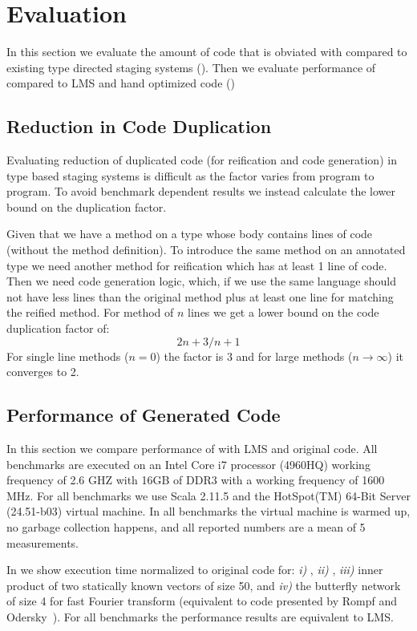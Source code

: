 \section{Evaluation}
\label{sct:evaluation}

In this section we evaluate the amount of code that is obviated with \tool compared to existing
type directed staging systems (). Then we evaluate performance of
\tool compared to LMS and hand optimized code ()

\subsection{Reduction in Code Duplication}
\label{sct:duplication}

Evaluating reduction of duplicated code (for reification and code generation) in type based
staging systems is difficult as the factor varies from program to program. To avoid benchmark dependent
results we instead calculate the lower bound on the duplication factor.

Given that we have a method on a type  whose body contains  lines of code (without
the method definition). To introduce the same method on an annotated type  we need another
 method for reification which has at least 1 line of code. Then we need code generation
 logic, which, if we use the same language should not have less lines than the original method
 plus at least one line for matching the reified method. For method of $n$ lines
 we get a lower bound on the code duplication factor of:$$
 2n+3/n+1
$$
For single line methods ($n=0$) the factor is 3 and for large methods ($n\rightarrow\infty$) it converges to 2.

\subsection{Performance of Generated Code}

In this section we compare performance of \tool with LMS and original code. All benchmarks
are executed on an Intel Core i7 processor (4960HQ) working frequency of 2.6 GHZ with 16GB
of DDR3 with a working frequency of 1600 MHz. For all benchmarks we use Scala
2.11.5 and the HotSpot(TM) 64-Bit Server (24.51-b03) virtual machine. In all benchmarks
the virtual machine is warmed up, no garbage collection happens, and all reported numbers are
a mean of 5 measurements.

In  we show execution time normalized to original code for:
 \emph{i)} ,
 \emph{ii)} ,
 \emph{iii)} inner product of two statically known vectors of size 50,
 and \emph{iv)} the butterfly network of size 4 for fast Fourier transform  (equivalent to code presented by Rompf and Odersky~\cite{rompf2012lightweight}). For all benchmarks the performance results are equivalent to LMS.

